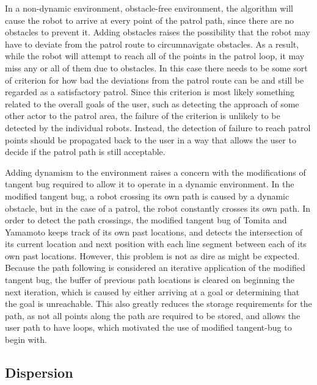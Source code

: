 In a non-dynamic environment, obstacle-free environment, the algorithm will cause the robot to arrive at every point of the patrol path, since there are no obstacles to prevent it.
Adding obstacles raises the possibility that the robot may have to deviate from the patrol route to circumnavigate obstacles. 
As a result, while the robot will attempt to reach all of the points in the patrol loop, it may miss any or all of them due to obstacles. 
In this case there needs to be some sort of criterion for how bad the deviations from the patrol route can be and still be regarded as a satisfactory patrol.
Since this criterion is most likely something related to the overall goals of the user, such as detecting the approach of some other actor to the patrol area, the failure of the criterion is unlikely to be detected by the individual robots. 
Instead, the detection of failure to reach patrol points should be propagated back to the user in a way that allows the user to decide if the patrol path is still acceptable. 

Adding dynamism to the environment raises a concern with the modifications of tangent bug required to allow it to operate in a dynamic environment. 
In the modified tangent bug, a robot crossing its own path is caused by a dynamic obstacle, but in the case of a patrol, the robot constantly crosses its own path. 
In order to detect the path crossings, the modified tangent bug of Tomita and Yamamoto keeps track of its own past locations, and detects the intersection of its current location and next position with each line segment between each of its own past locations. 
However, this problem is not as dire as might be expected. 
Because the path following is considered an iterative application of the modified tangent bug, the buffer of previous path locations is cleared on beginning the next iteration, which is caused by either arriving at a goal or determining that the goal is unreachable. 
This also greatly reduces the storage requirements for the path, as not all points along the path are required to be stored, and allows the user path to have loops, which motivated the use of modified tangent-bug to begin with. 

\subsection{Dispersion}

